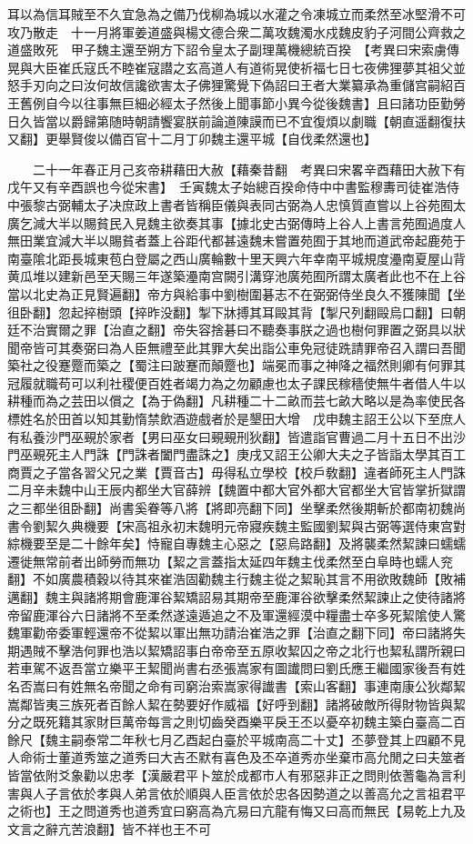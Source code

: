 耳以為信耳賊至不久宜急為之備乃伐柳為城以水灌之令凍城立而柔然至冰堅滑不可攻乃散走　十一月將軍姜道盛與楊文德合衆二萬攻魏濁水戍魏皮豹子河間公齊救之道盛敗死　甲子魏主還至朔方下詔令皇太子副理萬機總統百揆　【考異曰宋索虜傳晃與大臣崔氏寇氏不睦崔寇譛之玄高道人有道術晃使祈福七日七夜佛狸夢其祖父並怒手刃向之曰汝何故信讒欲害太子佛狸驚覺下偽詔曰王者大業纂承為重儲宫嗣紹百王舊例自今以往事無巨細必經太子然後上聞事節小異今從後魏書】且曰諸功臣勤勞日久皆當以爵歸第随時朝請饗宴朕前論道陳謨而已不宜復煩以劇職【朝直遥翻復扶又翻】更舉賢俊以備百官十二月丁卯魏主還平城【自伐柔然還也】

　　二十一年春正月己亥帝耕藉田大赦【藉秦昔翻　考異曰宋畧辛酉藉田大赦下有戊午又有辛酉誤也今從宋書】　壬寅魏太子始總百揆命侍中中書監穆夀司徒崔浩侍中張黎古弼輔太子决庶政上書者皆稱臣儀與表同古弼為人忠慎質直嘗以上谷苑囿太廣乞減大半以賜貧民入見魏主欲奏其事【據北史古弼傳時上谷人上書言苑囿過度人無田業宜減大半以賜貧者蓋上谷距代都甚遠魏未嘗置苑囿于其地而道武帝起鹿苑于南臺隂北距長城東苞白登屬之西山廣輪數十里天興六年幸南平城規度灅南夏屋山背黄瓜堆以建新邑至天賜三年遂築灅南宫闕引溝穿池廣苑囿所謂太廣者此也不在上谷當以北史為正見賢遍翻】帝方與給事中劉樹圍碁志不在弼弼侍坐良久不獲陳聞【坐徂卧翻】忽起捽樹頭【捽昨没翻】掣下牀搏其耳毆其背【掣尺列翻毆烏口翻】曰朝廷不治實爾之罪【治直之翻】帝失容捨碁曰不聽奏事朕之過也樹何罪置之弼具以狀聞帝皆可其奏弼曰為人臣無禮至此其罪大矣出詣公車免冠徒跣請罪帝召入謂曰吾聞築社之役蹇蹷而築之【蜀注曰跛蹇而顛蹷也】端冕而事之神降之福然則卿有何罪其冠履就職苟可以利社稷便百姓者竭力為之勿顧慮也太子課民稼穡使無牛者借人牛以耕種而為之芸田以償之【為于偽翻】凡耕種二十二畝而芸七畝大略以是為率使民各標姓名於田首以知其勤惰禁飲酒遊戲者於是墾田大增　戊申魏主詔王公以下至庶人有私養沙門巫覡於家者【男曰巫女曰覡覡刑狄翻】皆遣詣官曹過二月十五日不出沙門巫覡死主人門誅【門誅者闔門盡誅之】庚戌又詔王公卿大夫之子皆詣太學其百工商賈之子當各習父兄之業【賈音古】毋得私立學校【校戶敎翻】違者師死主人門誅　二月辛未魏中山王辰内都坐大官薛辨【魏置中都大官外都大官都坐大官皆掌折獄謂之三都坐徂卧翻】尚書奚眷等八將【將即亮翻下同】坐擊柔然後期斬於都南初魏尚書令劉絜久典機要【宋高祖永初末魏明元帝寢疾魏主監國劉絜與古弼等選侍東宫對綜機要至是二十餘年矣】恃寵自專魏主心惡之【惡烏路翻】及將襲柔然絜諫曰蠕蠕遷徙無常前者出師勞而無功【絜之言蓋指太延四年魏主伐柔然至白阜時也蠕人兖翻】不如廣農積穀以待其來崔浩固勸魏主行魏主從之絜恥其言不用欲敗魏師【敗補邁翻】魏主與諸將期會鹿渾谷絜矯詔易其期帝至鹿渾谷欲擊柔然絜諫止之使待諸將帝留鹿渾谷六日諸將不至柔然遂遠遁追之不及軍還經漠中糧盡士卒多死絜隂使人驚魏軍勸帝委軍輕還帝不從絜以軍出無功請治崔浩之罪【治直之翻下同】帝曰諸將失期遇賊不擊浩何罪也浩以絜矯詔事白帝帝至五原收絜囚之帝之北行也絜私謂所親曰若車駕不返吾當立樂平王絜聞尚書右丞張嵩家有圖䜟問曰劉氏應王繼國家後吾有姓名否嵩曰有姓無名帝聞之命有司窮治索嵩家得䜟書【索山客翻】事連南康公狄鄰絜嵩鄰皆夷三族死者百餘人絜在勢要好作威福【好呼到翻】諸將破敵所得財物皆與絜分之既死籍其家財巨萬帝每言之則切齒癸酉樂平戾王丕以憂卒初魏主築白臺高二百餘尺【魏主嗣泰常二年秋七月乙酉起白臺於平城南高二十丈】丕夢登其上四顧不見人命術士董道秀筮之道秀曰大吉丕默有喜色及丕卒道秀亦坐棄市高允閒之曰夫筮者皆當依附爻象勸以忠孝【漢嚴君平卜筮於成都市人有邪惡非正之問則依蓍龜為言利害與人子言依於孝與人弟言依於順與人臣言依於忠各因勢道之以善高允之言祖君平之術也】王之問道秀也道秀宜曰窮高為亢易曰亢龍有悔又曰高而無民【易乾上九及文言之辭亢苦浪翻】皆不祥也王不可
